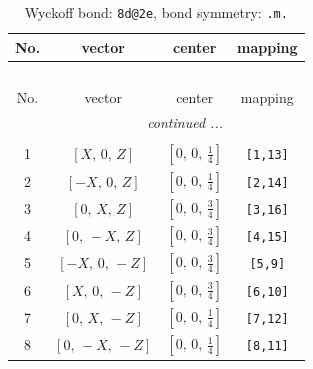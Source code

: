 \documentclass[fleqn,8pt]{jsarticle}
\begin{document}
\begin{longtable}{cccc}
\caption{Wyckoff bond: {\tt 8d@2e}, bond symmetry: {\tt .m.}}
 \\
 \hline \hline
No. & vector & center & mapping \\ \hline \endfirsthead

\multicolumn{3}{l}{\tablename\ \thetable{}} \\
 \hline \hline
No. & vector & center & mapping \\ \hline \endhead

 \hline \hline
\multicolumn{3}{r}{\footnotesize\it continued ...} \\ \endfoot

 \hline \hline
\multicolumn{3}{r}{} \\ \endlastfoot

1 & $\left[ X,\, 0,\, Z \right]$ & $\left[ 0,\, 0,\, \frac{1}{4} \right]$ & {\tt [1,13]} \\ \hline
2 & $\left[ - X,\, 0,\, Z \right]$ & $\left[ 0,\, 0,\, \frac{1}{4} \right]$ & {\tt [2,14]} \\ \hline
3 & $\left[ 0,\, X,\, Z \right]$ & $\left[ 0,\, 0,\, \frac{3}{4} \right]$ & {\tt [3,16]} \\ \hline
4 & $\left[ 0,\, - X,\, Z \right]$ & $\left[ 0,\, 0,\, \frac{3}{4} \right]$ & {\tt [4,15]} \\ \hline
5 & $\left[ - X,\, 0,\, - Z \right]$ & $\left[ 0,\, 0,\, \frac{3}{4} \right]$ & {\tt [5,9]} \\ \hline
6 & $\left[ X,\, 0,\, - Z \right]$ & $\left[ 0,\, 0,\, \frac{3}{4} \right]$ & {\tt [6,10]} \\ \hline
7 & $\left[ 0,\, X,\, - Z \right]$ & $\left[ 0,\, 0,\, \frac{1}{4} \right]$ & {\tt [7,12]} \\ \hline
8 & $\left[ 0,\, - X,\, - Z \right]$ & $\left[ 0,\, 0,\, \frac{1}{4} \right]$ & {\tt [8,11]} \\
\end{longtable}
\renewcommand{\arraystretch}{1.2}
\end{document}
